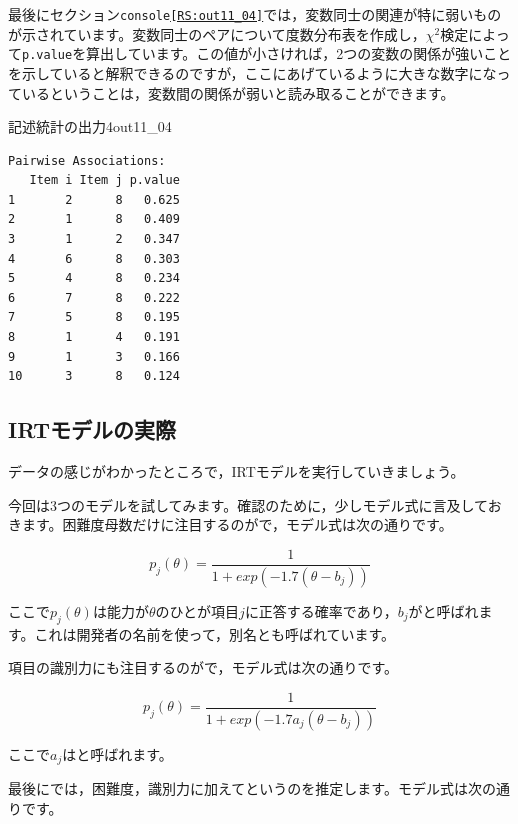 \documentclass{ltjsbook}
\begin{document}
最後にセクション\texttt{console\ref{RS:out11_04}}では，変数同士の関連が特に弱いものが示されています。変数同士のペアについて度数分布表を作成し，$\chi^2$検定によって\texttt{p.value}を算出しています。この値が小さければ，2つの変数の関係が強いことを示していると解釈できるのですが，ここにあげているように大きな数字になっているということは，変数間の関係が弱いと読み取ることができます。
\begin{Rscreen}{記述統計の出力4}{out11_04}
    \begin{verbatim}
Pairwise Associations:
   Item i Item j p.value
1       2      8   0.625
2       1      8   0.409
3       1      2   0.347
4       6      8   0.303
5       4      8   0.234
6       7      8   0.222
7       5      8   0.195
8       1      4   0.191
9       1      3   0.166
10      3      8   0.124
    \end{verbatim}
    \end{Rscreen}
\subsection{IRTモデルの実際}
データの感じがわかったところで，IRTモデルを実行していきましょう。

今回は3つのモデルを試してみます。確認のために，少しモデル式に言及しておきます。困難度母数だけに注目するのがで，モデル式は次の通りです。

\[ p_j(\theta) = \frac{1}{1+exp(-1.7 (\theta -b_j))} \]

ここで$p_j(\theta)$は能力が$\theta$のひとが項目$j$に正答する確率であり，$b_j$がと呼ばれます。これは開発者の名前を使って，別名とも呼ばれています。

項目の識別力にも注目するのがで，モデル式は次の通りです。

\[ p_j(\theta) = \frac{1}{1+exp(-1.7 a_j(\theta -b_j))} \]

ここで$a_j$はと呼ばれます。

最後にでは，困難度，識別力に加えてというのを推定します。モデル式は次の通りです。
\end{document}
